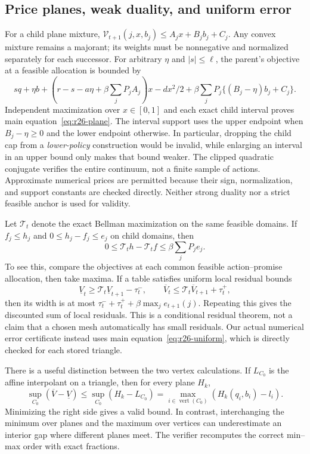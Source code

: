 \subsection{Price planes, weak duality, and uniform error}
For a child plane mixture, $\mathcal V_{t+1}(j,x,b_j)\leq A_jx+B_jb_j+C_j$. Any convex mixture remains a majorant; its weights must be nonnegative and normalized separately for each successor. For arbitrary $\eta$ and $|s|\leq\ell$, the parent's objective at a feasible allocation is bounded by
\[
 s q+\eta b+(r-s-a\eta+\beta\sum_jP_jA_j)x-dx^2/2
 +\beta\sum_jP_j\{(B_j-\eta)b_j+C_j\}.
\]
Independent maximization over $x\in[0,1]$ and each exact child interval proves main equation~\eqref{eq:r26-plane}. The interval support uses the upper endpoint when $B_j-\eta\geq0$ and the lower endpoint otherwise. In particular, dropping the child cap from a \emph{lower-policy} construction would be invalid, while enlarging an interval in an upper bound only makes that bound weaker. The clipped quadratic conjugate verifies the entire continuum, not a finite sample of actions. Approximate numerical prices are permitted because their sign, normalization, and support constants are checked directly. Neither strong duality nor a strict feasible anchor is used for validity.

Let $\mathcal T_t$ denote the exact Bellman maximization on the same feasible domains. If $f_j\leq h_j$ and $0\leq h_j-f_j\leq e_j$ on child domains, then
\begin{equation}\label{ec:eq:r26-contraction}
 0\leq\mathcal T_t h-\mathcal T_t f\leq\beta\sum_jP_j e_j.
\end{equation}
To see this, compare the objectives at each common feasible action--promise allocation, then take maxima. If a table satisfies uniform local residual bounds
\[
 \underline V_t\geq\mathcal T_t\underline V_{t+1}-\tau_t^-,\qquad
 \overline V_t\leq\mathcal T_t\overline V_{t+1}+\tau_t^+,
\]
then its width is at most $\tau_t^-+\tau_t^++\beta\max_j e_{t+1}(j)$. Repeating this gives the discounted sum of local residuals. This is a conditional residual theorem, not a claim that a chosen mesh automatically has small residuals. Our actual numerical error certificate instead uses main equation~\eqref{eq:r26-uniform}, which is directly checked for each stored triangle.

There is a useful distinction between the two vertex calculations. If $L_{C_0}$ is the affine interpolant on a triangle, then for every plane $H_k$,
\[
 \sup_{C_0}(\overline V-\underline V)
 \leq\sup_{C_0}(H_k-L_{C_0})
 =\max_{i\in\operatorname{vert}(C_0)}(H_k(q_i,b_i)-l_i).
\]
Minimizing the right side gives a valid bound. In contrast, interchanging the minimum over planes and the maximum over vertices can underestimate an interior gap where different planes meet. The verifier recomputes the correct min--max order with exact fractions.


